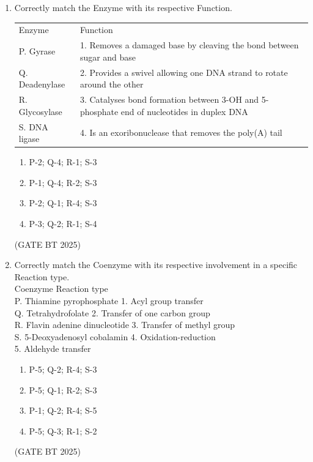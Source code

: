 \documentclass[journal,12pt,onecolumn]{IEEEtran}
\theoremstyle{remark}
\begin{document}
\begin{enumerate}
\item Correctly match the Enzyme with its respective Function.  

\begin{tabular}{ll}
Enzyme & Function \\
P. Gyrase & 1. Removes a damaged base by cleaving the bond between sugar and base \\
Q. Deadenylase & 2. Provides a swivel allowing one DNA strand to rotate around the other \\
R. Glycosylase & 3. Catalyses bond formation between 3-OH and 5-phosphate end of nucleotides in duplex DNA \\
S. DNA ligase & 4. Is an exoribonuclease that removes the poly(A) tail
\end{tabular}  

\begin{enumerate}
    \item P-2; Q-4; R-1; S-3
    \item P-1; Q-4; R-2; S-3
    \item P-2; Q-1; R-4; S-3
    \item P-3; Q-2; R-1; S-4
\end{enumerate}  
\hfill (GATE BT 2025)

\item Correctly match the Coenzyme with its respective involvement in a specific Reaction type.\\

Coenzyme \hspace{1cm} Reaction type \\
P. Thiamine pyrophosphate \hspace{0.5cm} 1. Acyl group transfer \\
Q. Tetrahydrofolate \hspace{1.3cm} 2. Transfer of one carbon group \\
R. Flavin adenine dinucleotide \hspace{0.3cm} 3. Transfer of methyl group \\
S. 5-Deoxyadenosyl cobalamin \hspace{0.3cm} 4. Oxidation-reduction \\
\hspace{3cm} 5. Aldehyde transfer

\begin{enumerate}
    \item P-5; Q-2; R-4; S-3
    \item P-5; Q-1; R-2; S-3
    \item P-1; Q-2; R-4; S-5
    \item P-5; Q-3; R-1; S-2
\end{enumerate}
\hfill (GATE BT 2025)


\end{enumerate}
\end{document}
